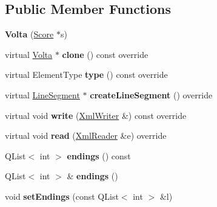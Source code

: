 \subsection*{Public Member Functions}
\begin{DoxyCompactItemize}
\item 
\mbox{\label{class_ms_1_1_volta_ac41aafc8aac95339fad849a06ae6e044}} 
{\bfseries Volta} (\hyperlink{class_ms_1_1_score}{Score} $\ast$s)
\item 
\mbox{\label{class_ms_1_1_volta_a00cdd2114b1fd189eb48a52f72a21033}} 
virtual \hyperlink{class_ms_1_1_volta}{Volta} $\ast$ {\bfseries clone} () const override
\item 
\mbox{\label{class_ms_1_1_volta_a8d7d64edb96e45263d21223cbfdc5a38}} 
virtual Element\+Type {\bfseries type} () const override
\item 
\mbox{\label{class_ms_1_1_volta_ade8a6797a18ec3469acd5de86e11962d}} 
virtual \hyperlink{class_ms_1_1_line_segment}{Line\+Segment} $\ast$ {\bfseries create\+Line\+Segment} () override
\item 
\mbox{\label{class_ms_1_1_volta_ab1eac1788efc041899489d153e2b54d7}} 
virtual void {\bfseries write} (\hyperlink{class_ms_1_1_xml_writer}{Xml\+Writer} \&) const override
\item 
\mbox{\label{class_ms_1_1_volta_a14bf1f753e709e3a38e2f8de06c752ad}} 
virtual void {\bfseries read} (\hyperlink{class_ms_1_1_xml_reader}{Xml\+Reader} \&e) override
\item 
\mbox{\label{class_ms_1_1_volta_ae896a3107b56fb23a8fb5e702f58fedf}} 
Q\+List$<$ int $>$ {\bfseries endings} () const
\item 
\mbox{\label{class_ms_1_1_volta_aaa1a6f1669cb2a73d037150f80f89db1}} 
Q\+List$<$ int $>$ \& {\bfseries endings} ()
\item 
\mbox{\label{class_ms_1_1_volta_aa8a2865e5a4062a0a11c0d965a60a511}} 
void {\bfseries set\+Endings} (const Q\+List$<$ int $>$ \&l)
\item 

\end{DoxyCompactItemize}
